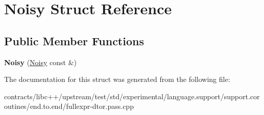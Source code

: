 \hypertarget{struct_noisy}{}\section{Noisy Struct Reference}
\label{struct_noisy}
\subsection*{Public Member Functions}
\begin{DoxyCompactItemize}
\item 
\mbox{\label{struct_noisy_a9ce11df6ab9c4a1dd2061b893755367e}} 
{\bfseries Noisy} (\mbox{\hyperlink{struct_noisy}{Noisy}} const \&)
\end{DoxyCompactItemize}


The documentation for this struct was generated from the following file\+:\begin{DoxyCompactItemize}
\item 
contracts/libc++/upstream/test/std/experimental/language.\+support/support.\+coroutines/end.\+to.\+end/fullexpr-\/dtor.\+pass.\+cpp\end{DoxyCompactItemize}
